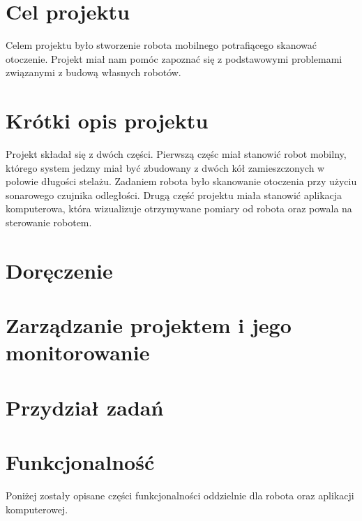 \documentclass[a4paper]{article}
\begin{document}

\newpage

\tableofcontents
\listoffigures

\newpage

\section{Cel projektu}
Celem projektu było stworzenie robota mobilnego potrafiącego skanować otoczenie. Projekt miał nam pomóc zapoznać się z podstawowymi problemami związanymi z budową własnych robotów. 

\section{Krótki opis projektu}
Projekt składał się z dwóch części. Pierwszą częśc miał stanowić robot mobilny, którego system jedzny miał być zbudowany z dwóch kół zamieszczonych w połowie długości stelażu. Zadaniem robota było skanowanie otoczenia przy użyciu sonarowego czujnika odległości. \newline
Drugą część projektu miała stanowić aplikacja komputerowa, która wizualizuje otrzymywane pomiary od robota oraz powala na sterowanie robotem. 

\section{Doręczenie}




\section{Zarządzanie projektem i jego monitorowanie}


\section{Przydział zadań}


\section{Funkcjonalność}
Poniżej zostały opisane części funkcjonalności oddzielnie dla robota oraz aplikacji komputerowej.
\end{document}
